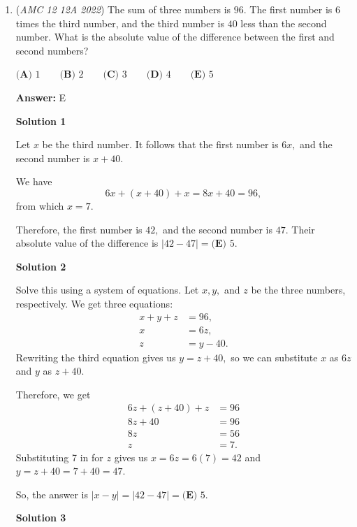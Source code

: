 \begin{enumerate}
 (Note: Integer solutions increase exponentially, so our next solution will have a numerator greater than $3^2(109)$. Therefore, when you don't see numerators greater than $3^2(109)$ in the answer choices, this method should be fine.)

 


	\item (\textit{AMC 12 12A 2022}) The sum of three numbers is $96.$ The first number is $6$ times the third number, and the third number is $40$ less than the second number. What is the absolute value of the difference between the first and second numbers?


 $\textbf{(A) } 1 \qquad \textbf{(B) } 2 \qquad \textbf{(C) } 3 \qquad \textbf{(D) } 4 \qquad \textbf{(E) } 5$

 \textbf{Answer: }E



\textbf{Solution 1}

Let $x$ be the third number. It follows that the first number is $6x,$ and the second number is $x+40.$

 We have 
 \[6x+(x+40)+x=8x+40=96,\] from which $x=7.$

 Therefore, the first number is $42,$ and the second number is $47.$ Their absolute value of the difference is $|42-47|=\boxed{\textbf{(E) } 5}.$




\textbf{Solution 2}

Solve this using a system of equations. Let $x,y,$ and $z$ be the three numbers, respectively. We get three equations:
 \begin{align*} x+y+z&=96, \\ x&=6z, \\ z&=y-40. \end{align*}
Rewriting the third equation gives us $y=z+40,$ so we can substitute $x$ as $6z$ and $y$ as $z+40.$

 Therefore, we get
 \begin{align*} 6z+(z+40)+z&=96 \\ 8z+40&=96 \\ 8z&=56 \\ z&=7. \end{align*}
Substituting 7 in for $z$ gives us $x=6z=6(7)=42$ and $y=z+40=7+40=47.$

 So, the answer is $|x-y|=|42-47|=\boxed{\textbf{(E) } 5}.$




\textbf{Solution 3}


\end{enumerate}
